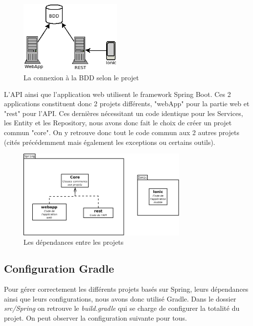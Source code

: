			\begin{figure}[H]
				\centering\includegraphics[width=0.45\textwidth, keepaspectratio]{res/diag_infra.png}
				\caption{La connexion à la BDD selon le projet}
			\end{figure}

			L'API ainsi que l'application web utilisent le framework Spring Boot. Ces 2 applications constituent donc 2 projets différents, "webApp" pour la partie web et "rest" pour l'API. Ces dernières nécessitant un code identique pour les Services, les Entity et les Repository, nous avons donc fait le choix de créer un projet commun "core". On y retrouve donc tout le code commun aux 2 autres projets (cités précédemment mais également les exceptions ou certains outils).

			\begin{figure}[H]
				\centering\includegraphics[width=0.75\textwidth, keepaspectratio]{res/diag_projet.png}
				\caption{Les dépendances entre les projets}
			\end{figure}

		\subsection{Configuration Gradle}

			Pour gérer correctement les différents projets basés sur Spring, leurs dépendances ainsi que leurs configurations, nous avons donc utilisé Gradle. Dans le dossier \textit{src/Spring} on retrouve le \textit{build.gradle} qui se charge de configurer la totalité du projet. On peut observer la configuration suivante pour tous.

